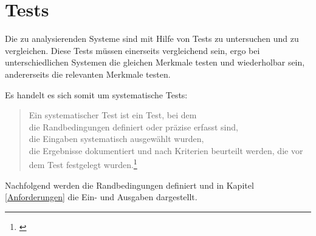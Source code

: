 \section{Tests}

Die zu analysierenden Systeme sind mit Hilfe von Tests zu untersuchen und zu vergleichen.
Diese Tests müssen einerseits vergleichend sein, ergo bei unterschiedlichen Systemen die gleichen Merkmale testen und wiederholbar sein, andererseits die relevanten Merkmale testen.

Es handelt es sich somit um systematische Tests:
\begin {quote}
Ein systematischer Test ist ein Test, bei dem\\
die Randbedingungen definiert oder präzise erfasst sind,\\
die Eingaben systematisch ausgewählt wurden,\\
die Ergebnisse dokumentiert und nach Kriterien beurteilt werden, die vor dem Test festgelegt wurden.\footnote{\cite[S.446]{book:softwareengineering}}
\end{quote}

Nachfolgend werden die Randbedingungen definiert und in Kapitel \ref{Anforderungen} die Ein- und Ausgaben dargestellt.


